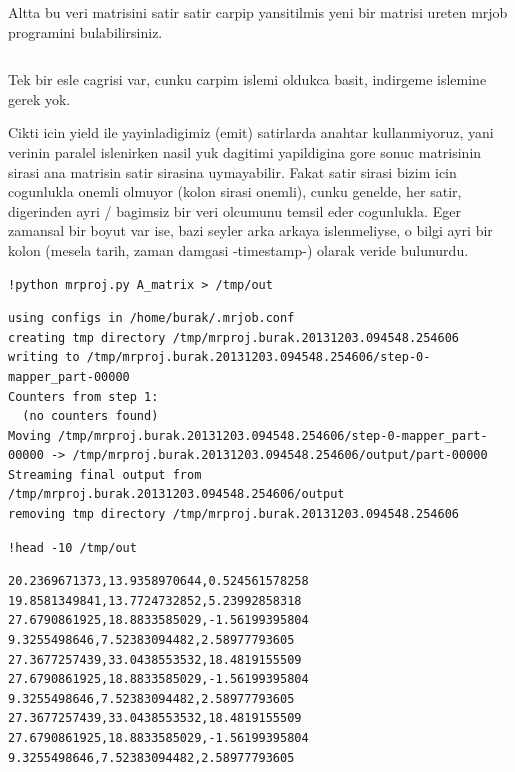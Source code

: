 \documentclass[12pt,fleqn]{article}\usepackage{../common}
\begin{document}
Altta bu veri matrisini satir satir carpip yansitilmis yeni bir
matrisi ureten mrjob programini bulabilirsiniz.

\inputminted[fontsize=\footnotesize]{python}{mrproj.py}

Tek bir esle cagrisi var, cunku carpim islemi oldukca basit, indirgeme
islemine gerek yok.

Cikti icin yield ile yayinladigimiz (emit) satirlarda anahtar
kullanmiyoruz, yani verinin paralel islenirken nasil yuk dagitimi
yapildigina gore sonuc matrisinin sirasi ana matrisin satir sirasina
uymayabilir. Fakat satir sirasi bizim icin cogunlukla onemli olmuyor
(kolon sirasi onemli), cunku genelde, her satir, digerinden ayri /
bagimsiz bir veri olcumunu temsil eder cogunlukla. Eger zamansal bir
boyut var ise, bazi seyler arka arkaya islenmeliyse, o bilgi ayri bir
kolon (mesela tarih, zaman damgasi -timestamp-) olarak veride
bulunurdu.

\begin{verbatim}
!python mrproj.py A_matrix > /tmp/out
\end{verbatim}

\begin{verbatim}
using configs in /home/burak/.mrjob.conf
creating tmp directory /tmp/mrproj.burak.20131203.094548.254606
writing to /tmp/mrproj.burak.20131203.094548.254606/step-0-mapper_part-00000
Counters from step 1:
  (no counters found)
Moving /tmp/mrproj.burak.20131203.094548.254606/step-0-mapper_part-00000 -> /tmp/mrproj.burak.20131203.094548.254606/output/part-00000
Streaming final output from /tmp/mrproj.burak.20131203.094548.254606/output
removing tmp directory /tmp/mrproj.burak.20131203.094548.254606
\end{verbatim}

\begin{verbatim}
!head -10 /tmp/out
\end{verbatim}

\begin{verbatim}
20.2369671373,13.9358970644,0.524561578258
19.8581349841,13.7724732852,5.23992858318
27.6790861925,18.8833585029,-1.56199395804
9.3255498646,7.52383094482,2.58977793605
27.3677257439,33.0438553532,18.4819155509
27.6790861925,18.8833585029,-1.56199395804
9.3255498646,7.52383094482,2.58977793605
27.3677257439,33.0438553532,18.4819155509
27.6790861925,18.8833585029,-1.56199395804
9.3255498646,7.52383094482,2.58977793605
\end{verbatim}
\end{document}
